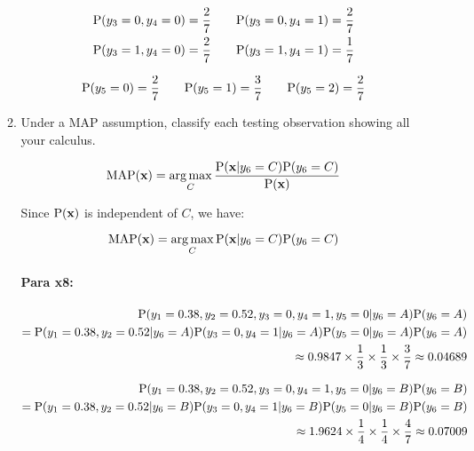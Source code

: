 \documentclass[12pt]{article}
\DeclareMathOperator*{\argmax}{arg\,max}
\begin{document}
\begin{enumerate}[leftmargin=\labelsep]
\begin{enumerate}
        \begin{equation}
        \begin{split}
            \textrm{P}(y_3 = 0, y_4 = 0) = \frac{2}{7} &\qquad \textrm{P}(y_3 = 0, y_4 = 1) = \frac{2}{7} \\
            \textrm{P}(y_3 = 1, y_4 = 0) = \frac{2}{7} &\qquad \textrm{P}(y_3 = 1, y_4 = 1) = \frac{1}{7}
        \end{split}
        \end{equation}

        \begin{equation}
            \textrm{P}(y_5 = 0) = \frac{2}{7} \qquad \textrm{P}(y_5 = 1) = \frac{3}{7} \qquad \textrm{P}(y_5 = 2) = \frac{2}{7}
        \end{equation}

        \item Under a MAP assumption, classify each testing observation showing all your calculus.
    
        \begin{equation}
            \textrm{MAP}(\textbf{x}) = \argmax_C \frac{\prob(\textbf{x}|y_6 = C)\prob(y_6 = C)}{\prob(\textbf{x})}
        \end{equation}

        Since $\textrm{P}(\textbf{x})$ is independent of $C$, we have:

        \begin{equation}
            \textrm{MAP}(\textbf{x}) = \argmax_C \prob(\textbf{x}|y_6 = C)\prob(y_6 = C)
        \end{equation}

        \paragraph{Para x8:}

        \begin{equation}
        \begin{split}
            \textrm{P}(y_1 = 0.38, y_2 = 0.52, y_3 = 0, y_4 = 1, y_5 = 0|y_6 = A)\textrm{P}(y_6 = A)\\
            = \textrm{P}(y_1 = 0.38, y_2 = 0.52|y_6 = A)\textrm{P}(y_3 = 0, y_4 = 1|y_6 = A)\textrm{P}(y_5 = 0|y_6 = A)\textrm{P}(y_6 = A)\\
            \approx 0.9847 \times \frac{1}{3} \times \frac{1}{3} \times \frac{3}{7} \approx 0.04689
        \end{split}
        \end{equation}

        \begin{equation}
        \begin{split}
            \textrm{P}(y_1 = 0.38, y_2 = 0.52, y_3 = 0, y_4 = 1, y_5 = 0|y_6 = B)\textrm{P}(y_6 = B)\\
            = \textrm{P}(y_1 = 0.38, y_2 = 0.52|y_6 = B)\textrm{P}(y_3 = 0, y_4 = 1|y_6 = B)\textrm{P}(y_5 = 0|y_6 = B)\textrm{P}(y_6 = B)\\
            \approx 1.9624 \times \frac{1}{4} \times \frac{1}{4} \times \frac{4}{7} \approx 0.07009
        \end{split}
        \end{equation}


\end{enumerate}
\end{enumerate}
\end{document}

